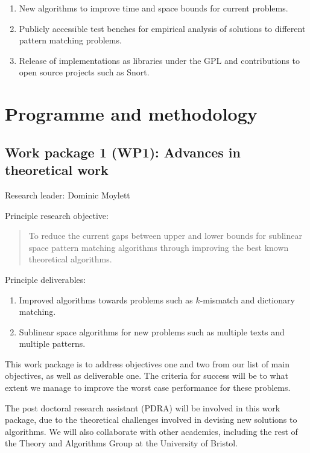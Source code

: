 \documentclass[a4paper,11pt]{article}
\begin{document}
    \begin{enumerate}
        \item New algorithms to improve time and space bounds for current problems.
        \item Publicly accessible test benches for empirical analysis of solutions to different pattern matching problems.
        \item Release of implementations as libraries under the GPL and contributions to open source projects such as Snort.
    \end{enumerate}

    \section{Programme and methodology}

    \subsection*{Work package 1 (WP1): Advances in theoretical work}

    Research leader: Dominic Moylett

    Principle research objective:
    \begin{quote}
        To reduce the current gaps between upper and lower bounds for sublinear space pattern matching algorithms through improving the best known theoretical algorithms.
    \end{quote}

    Principle deliverables:
    \begin{enumerate}
        \item Improved algorithms towards problems such as $k$-mismatch and dictionary matching.
        \item Sublinear space algorithms for new problems such as multiple texts and multiple patterns.
    \end{enumerate}

    This work package is to address objectives one and two from our list of main objectives, as well as deliverable one. The criteria for success will be to what extent we manage to improve the worst case performance for these problems.

    The post doctoral research assistant (PDRA) will be involved in this work package, due to the theoretical challenges involved in devising new solutions to algorithms. We will also collaborate with other academics, including the rest of the Theory and Algorithms Group at the University of Bristol.
\end{document}
